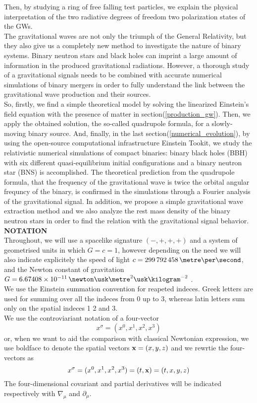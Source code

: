 Then, by studying a ring of free falling test particles, we explain the physical interpretation of the two radiative degrees of freedom two polarization states of the GWs.\\
The gravitational waves are not only the triumph of the General Relativity, but they also give us a completely new method to investigate the nature of binary systems. 
Binary neutron stars and black holes can imprint a large amount of information in the produced gravitational radiations.
However, a thorough study of a gravitational signals needs to be combined with accurate numerical simulations of binary mergers in order to fully understand the link between the  gravitational wave production and their sources.\\
So, firstly, we find a simple theoretical model by solving the linearized Einstein's field equation with the presence of matter in section(\ref{production_gw}).
Then, we apply the obtained solution, the so-called quadrupole formula, for a slowly-moving binary source.
And, finally, in the last section(\ref{numerical_evolution}), by using the open-source computational infrastructure Einstein Tookit\cite{loffler_einstein_2012}, we study the relativistic numerical simulations of compact binaries: binary black holes (BBH) with six different quasi-equilibrium initial configurations and a binary neutron star (BNS) is accomplished.
The theoretical prediction from the quadrupole formula, that the frequency of the gravitational wave is twice the orbital angular frequncy of the binary, is confirmed in the simulations through a Fourier analysis of the gravitational signal.
In addition, we propose a simple gravitational wave extraction method and we also analyze the rest mass density of the binary neutron stars in order to find the relation with the gravitational signal behavior.\\

\textbf{NOTATION}\\
Throughout, we will use a spacelike signature $(-,+,+,+)$ and a system of geometrised units in which $G=c=1$, however depending on the need we will also indicate explicitely the speed of light $c=299\,792\,458 \,\metre \per \second$, and the Newton constant of gravitation $G=6.67408 \times 10^{-11} \, \newton \usk \metre^2 \usk \kilogram^{-2}$ \cite{codata_blog_codata_nodate}.\\
We use the Einstein summation convention for  reapeted indeces.
Greek letters are used for summing over all the indeces from 0 up to 3,
whereas latin letters sum only on the spatial indeces 1 2 and 3.\\
We use the controviariant notation of a four-vector
\[
x^{\sigma} = (x^{0},x^{1}, x^{2},x^{3})
\]
or, when we want to aid the comparison with classical Newtonian expression, we use boldface to denote the spatial vectors $\vb{x} =(x,y,z)$ and we rewrtie the four-vectors as 
\[
x^{\sigma} = (x^{0},x^{1}, x^{2},x^{3}) = (t,\vb{x}) = (t,x,y,z)
\]
The four-dimensional covariant and partial derivatives will be indicated respectively with $\nabla _{\mu}$ and $\partial _\mu$.\\

